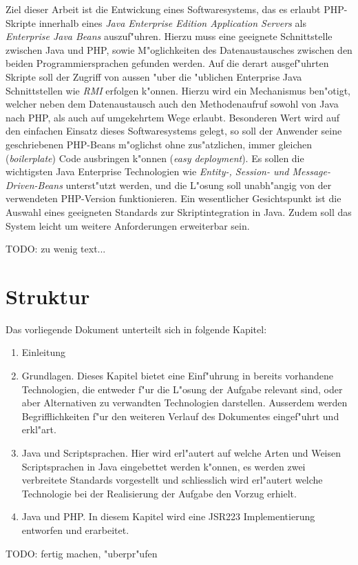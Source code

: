 Ziel dieser Arbeit ist die Entwickung eines Softwaresystems, das es erlaubt PHP-Skripte innerhalb eines 
\emph{Java Enterprise Edition Application Servers} als \emph{Enterprise Java Beans} auszuf"uhren.
Hierzu muss eine geeignete Schnittstelle zwischen Java und PHP, sowie M"oglichkeiten des Datenaustausches zwischen
den beiden Programmiersprachen gefunden werden. Auf die derart ausgef"uhrten Skripte soll der Zugriff von aussen "uber
die "ublichen Enterprise Java Schnittstellen wie \emph{RMI} erfolgen k"onnen. Hierzu wird ein Mechanismus ben"otigt,
welcher neben dem Datenaustausch auch den Methodenaufruf sowohl von Java nach PHP, als auch auf umgekehrtem Wege 
erlaubt. Besonderen Wert wird auf den einfachen Einsatz dieses Softwaresystems gelegt, so soll der Anwender
seine geschriebenen PHP-Beans m"oglichst ohne zus"atzlichen, immer gleichen (\emph{boilerplate}) Code ausbringen
k"onnen (\emph{easy deployment}). Es sollen die wichtigsten Java Enterprise Technologien wie
\emph{Entity-, Session- und Message-Driven-Beans} unterst"utzt werden, und die L"osung soll unabh"angig von der
verwendeten PHP-Version funktionieren. Ein wesentlicher Gesichtspunkt ist die Auswahl eines geeigneten Standards
zur Skriptintegration in Java. Zudem soll das System leicht um weitere Anforderungen erweiterbar sein.


TODO: zu wenig text...

\section{Struktur}
\label{sec:intro:structure}

Das vorliegende Dokument unterteilt sich in folgende Kapitel:

\begin{enumerate}
    \item Einleitung
    \item Grundlagen. Dieses Kapitel bietet eine Einf"uhrung in bereits vorhandene Technologien, die entweder
    f"ur die L"osung der Aufgabe relevant sind, oder aber Alternativen zu verwandten Technologien darstellen.
    Ausserdem werden Begrifflichkeiten f"ur den weiteren Verlauf des Dokumentes eingef"uhrt und erkl"art.
    \item Java und Scriptsprachen. Hier wird erl"autert auf welche Arten und Weisen Scriptsprachen in Java
    eingebettet werden k"onnen, es werden zwei verbreitete Standards vorgestellt und schliesslich wird
    erl"autert welche Technologie bei der Realisierung der Aufgabe den Vorzug erhielt.
    \item Java und PHP. In diesem Kapitel wird eine JSR223 Implementierung entworfen und erarbeitet.
\end{enumerate}

TODO: fertig machen, "uberpr"ufen


